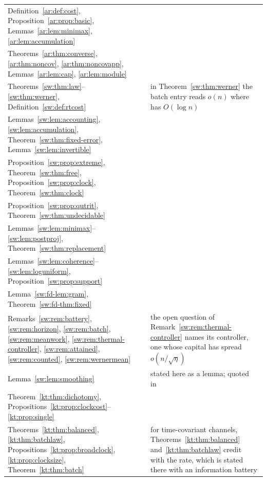 \begin{small}
\begin{longtable}{@{}>{\raggedright\arraybackslash}p{}>{\raggedright\arraybackslash}p{}>{\raggedright\arraybackslash}p{}@{}}
Definition~\ref{ar:def:cost}, Proposition~\ref{ar:prop:basic}, Lemmas~\ref{ar:lem:minimax}, \ref{ar:lem:accumulation} & \cite[Def.~1, Prop.~5, Lemmas~6, 7]{Answering} & \\
Theorems~\ref{ar:thm:converse}, \ref{ar:thm:noncov}, \ref{ar:thm:noncovapp}, Lemmas~\ref{ar:lem:cap}, \ref{ar:lem:module} & \cite[Thms.~8, 9, 11, Lemmas~10, 12]{Answering} & \\
Theorems~\ref{sw:thm:law}--\ref{sw:thm:werner}, Definition~\ref{sw:def:rtcost} & \cite[Thms.~1--3, Def.~1]{SaveWork} & in Theorem~\ref{sw:thm:werner} the batch entry reads $o(n)$ where~\cite{SaveWork} has $O(\log n)$\\
Lemmas~\ref{sw:lem:accounting}, \ref{sw:lem:accumulation}, Theorem~\ref{sw:thm:fixed-error}, Lemma~\ref{sw:lem:invertible} & \cite[Lemmas~4, 5, Thm.~6, Lemma~7]{SaveWork} & \\
Proposition~\ref{sw:prop:extreme}, Theorem~\ref{sw:thm:free}, Proposition~\ref{sw:prop:clock}, Theorem~\ref{sw:thm:clock} & \cite[Prop.~8, Thm.~9, Prop.~10, Thm.~11]{SaveWork} & \\
Proposition~\ref{sw:prop:qutrit}, Theorem~\ref{sw:thm:undecidable} & \cite[Prop.~12, Thm.~13]{SaveWork} & \\
Lemmas~\ref{sw:lem:minimax}--\ref{sw:lem:postproj}, Theorem~\ref{sw:thm:replacement} & \cite[Lemmas~14--17, Thm.~18]{SaveWork} & \\
Lemmas~\ref{sw:lem:coherence}--\ref{sw:lem:loguniform}, Proposition~\ref{sw:prop:support} & \cite[Lemmas~19--21, Prop.~22]{SaveWork} & \\
Lemma~\ref{sw:fd-lem:gram}, Theorem~\ref{sw:fd-thm:fixed} & \cite[Lemma~23, Thm.~24]{SaveWork} & \\
Remarks~\ref{sw:rem:battery}, \ref{sw:rem:horizon}, \ref{sw:rem:batch}, \ref{sw:rem:meanwork}, \ref{sw:rem:thermal-controller}, \ref{sw:rem:attained}, \ref{sw:rem:counted}, \ref{sw:rem:wernermean} & \cite[Remarks~1--8]{SaveWork} & the open question of Remark~\ref{sw:rem:thermal-controller} names its controller, one whose capital has spread $o(n/\sqrt\eta)$\\
Lemma~\ref{sw:lem:smoothing} & \cite[Thm.~4.1, Cor.~4.3]{Douglas26closed} & stated here as a lemma; quoted in~\cite{SaveWork}\\
Theorem~\ref{kt:thm:dichotomy}, Propositions~\ref{kt:prop:clockcost}--\ref{kt:prop:single} & \cite[Thm.~1, Props.~2--5]{KeepingTime} & \\
Theorems~\ref{kt:thm:balanced}, \ref{kt:thm:batchlaw}, Propositions~\ref{kt:prop:broadclock}, \ref{kt:prop:clocksize}, Theorem~\ref{kt:thm:batch} & \cite[Thms.~6, 7, Props.~8, 9, Thm.~10]{KeepingTime} & for time-covariant channels, Theorems~\ref{kt:thm:balanced} and~\ref{kt:thm:batchlaw} credit~\cite{FBB21} with the rate, which is stated there with an information battery\\

\end{longtable}
\end{small}
